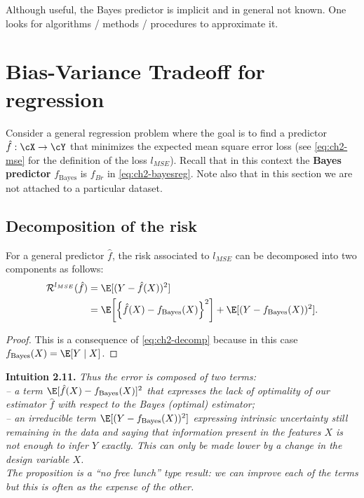 Although useful, the Bayes predictor is implicit and in general not known.
One looks for algorithms / methods / procedures to approximate it.

\section{Bias-Variance Tradeoff for regression}
\label{sec:ch2-biasvar}

Consider a general regression problem where the goal is to find a predictor
$\hat{f} : \cX \to \cY$ that minimizes the expected mean square error loss (see \eqref{eq:ch2-mse}
for the definition of the loss $l_{MSE}$). Recall that in this context the \textbf{Bayes
predictor} $f_{\text{Bayes}}$ is $f_{Br}$ in \eqref{eq:ch2-bayesreg}. Note also that in this section we are not
attached to a particular dataset.

\subsection{Decomposition of the risk}
\label{sec:ch2-riskdecomp}

\begin{proposition}\label{prop:ch2-riskdecomp}
For a general predictor $\hat{f}$, the risk associated to $l_{MSE}$ can
be decomposed into two components as follows:
\begin{equation}\label{eq:ch2-riskdecomp}
\begin{aligned}
\mathcal{R}^{l_{MSE}}(\hat{f}) &= \E[(Y - \hat{f}(X))^2] \\
&= \E\!\left[\left\{\hat{f}(X) - f_{\text{Bayes}}(X)\right\}^2\right] + \E[(Y - f_{\text{Bayes}}(X))^2].
\end{aligned}
\end{equation}
\end{proposition}

\begin{proof}
This is a consequence of \eqref{eq:ch2-decomp} because in this case $f_{\text{Bayes}}(X) = \E[Y \mid X]$.
\end{proof}

\begin{tcolorbox}[remarkbox]
\textbf{Intuition 2.11.} \textit{Thus the error is composed of two terms:\\
-- a term $\E[\hat{f}(X) - f_{\text{Bayes}}(X)]^2$ that expresses the lack of optimality of
our estimator $\hat{f}$ with respect to the Bayes (optimal) estimator;\\
-- an irreducible term $\E[(Y - f_{\text{Bayes}}(X))^2]$ expressing intrinsic uncertainty
still remaining in the data and saying that information present in the
features $X$ is not enough to infer $Y$ exactly. This can only be made
lower by a change in the design variable $X$.\\
The proposition is a ``no free lunch'' type result: we can improve each
of the terms but this is often as the expense of the other.}
\end{tcolorbox}


